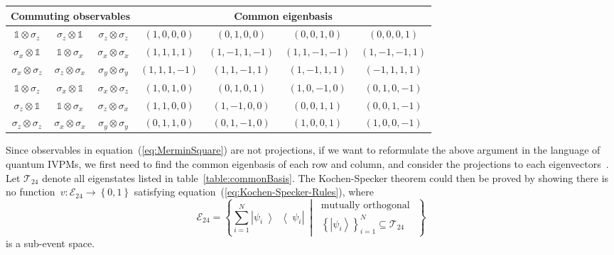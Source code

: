 \documentclass[english,reprint, aps, prl,superscriptaddress, showpacs,
showkeys]{revtex4-1}
\theoremstyle{plain}
\theoremstyle{definition}
\newcommand{\events}{\ensuremath{\mathcal{E}}}
\newcommand{\ket}[1]{{\left\vert{#1}\right\rangle}}
\newcommand{\op}[2]{\ensuremath{\left\vert{#1}\middle\rangle\middle\langle{#2}\right\vert}}
\newcommand{\proj}[1]{\op{#1}{#1}}
\newcommand{\set}[2]{\ensuremath{\left\{ {#1}~\middle|~{#2}\right\} }}
\begin{document}
\begin{table*}
\caption{\label{table:commonBasis}In each row, three observables are listed
in the left column commutes, and their common eigenbasis is listed
in the right column. In order to unified and simplify notation, we
do not normalize eigenstates, and represent the state~$\alpha_{0}\ket{0}+\alpha_{1}\ket{1}+\alpha_{2}\ket{2}+\alpha_{3}\ket{3}$
as $\left(\alpha_{0},\alpha_{1},\alpha_{2},\alpha_{3}\right)$.}

\begin{ruledtabular}
\begin{tabular}{ccc|cccc}
\multicolumn{3}{c}{Commuting observables} & \multicolumn{4}{c}{Common eigenbasis}\tabularnewline
\hline 
$\mathbb{1}\otimes\sigma_{z}$  & $\sigma_{z}\otimes\mathbb{1}$  & $\sigma_{z}\otimes\sigma_{z}$  & $(1,0,0,0)$  & $(0,1,0,0)$  & $(0,0,1,0)$  & $(0,0,0,1)$ \tabularnewline
$\sigma_{x}\otimes\mathbb{1}$  & $\mathbb{1}\otimes\sigma_{x}$  & $\sigma_{x}\otimes\sigma_{x}$  & $(1,1,1,1)$  & $(1,-1,1,-1)$  & $(1,1,-1,-1)$  & $(1,-1,-1,1)$ \tabularnewline
$\sigma_{x}\otimes\sigma_{z}$  & $\sigma_{z}\otimes\sigma_{x}$  & $\sigma_{y}\otimes\sigma_{y}$  & $(1,1,1,-1)$  & $(1,1,-1,1)$  & $(1,-1,1,1)$  & $(-1,1,1,1)$ \tabularnewline
$\mathbb{1}\otimes\sigma_{z}$  & $\sigma_{x}\otimes\mathbb{1}$  & $\sigma_{x}\otimes\sigma_{z}$  & $(1,0,1,0)$  & $(0,1,0,1)$  & $(1,0,-1,0)$  & $(0,1,0,-1)$ \tabularnewline
$\sigma_{z}\otimes\mathbb{1}$  & $\mathbb{1}\otimes\sigma_{x}$  & $\sigma_{z}\otimes\sigma_{x}$  & $(1,1,0,0)$  & $(1,-1,0,0)$  & $(0,0,1,1)$  & $(0,0,1,-1)$ \tabularnewline
$\sigma_{z}\otimes\sigma_{z}$  & $\sigma_{x}\otimes\sigma_{x}$  & $\sigma_{y}\otimes\sigma_{y}$  & $(0,1,1,0)$  & $(0,1,-1,0)$  & $(1,0,0,1)$  & $(1,0,0,-1)$ \tabularnewline
\end{tabular}
\end{ruledtabular}

\end{table*}

Since observables in equation~(\ref{eq:MerminSquare}) are not projections,
if we want to reformulate the above argument in the language of quantum
IVPMs, we first need to find the common eigenbasis of each row and
column, and consider the projections to each eigenvectors~\citep{Kernaghan1994,peres1995quantum}.
Let $\mathcal{T}_{24}$ denote all eigenstates listed in table~\ref{table:commonBasis}.
The Kochen-Specker theorem could then be proved by showing there is
no function~$v:\events_{24}\rightarrow\left\{ 0,1\right\} $ satisfying
equation~(\ref{eq:Kochen-Specker-Rules}), where 
\begin{equation}
\events_{24}=\set{\sum_{i=1}^{N}\proj{\psi_{i}}}{\begin{gathered}\textrm{mutually orthogonal }\\
\left\{ \ket{\psi_{i}}\right\} _{i=1}^{N}\subseteq\mathcal{T}_{24}
\end{gathered}
}
\end{equation}
is a sub-event space.
\end{document}
